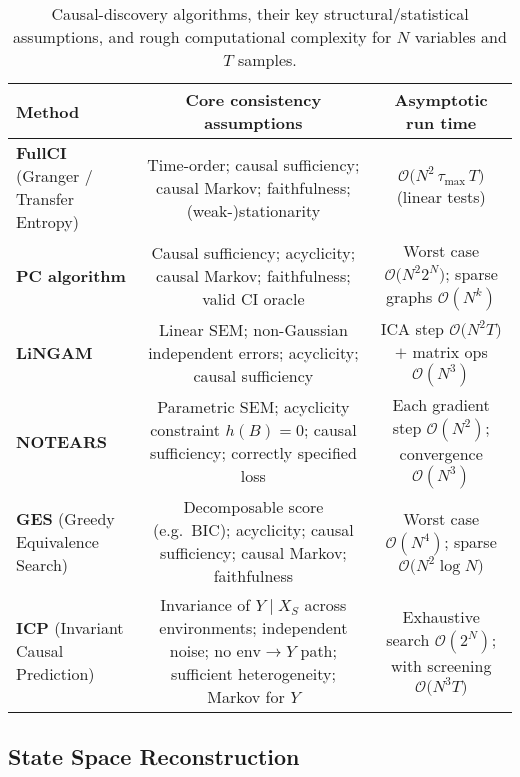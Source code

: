 \documentclass[14pt]{extarticle}
\begin{document}
	\begin{table}[htbp]
		\centering
		\begin{tabulary}{\textwidth}{L|C|C}
			\toprule
			\textbf{Method} & \textbf{Core consistency assumptions} & \textbf{Asymptotic run time}\\
			\midrule
			\textbf{FullCI} (Granger / Transfer Entropy) &
			Time-order; causal sufficiency; causal Markov; faithfulness; (weak-)stationarity &
			$\mathcal O\!\bigl(N^{2}\,\tau_{\max}\,T\bigr)$ (linear tests)\\[4pt] \hline
			
			\textbf{PC algorithm} &
			Causal sufficiency; acyclicity; causal Markov; faithfulness; valid CI oracle &
			Worst case $\mathcal O\!\bigl(N^{2}2^{N}\bigr)$; sparse graphs $\mathcal O(N^{k})$\\[4pt] \hline
			
			\textbf{LiNGAM} &
			Linear SEM; non-Gaussian independent errors; acyclicity; causal sufficiency &
			ICA step $\mathcal O\!\bigl(N^{2}T\bigr)$ $+$ matrix ops $\mathcal O(N^{3})$\\[4pt] \hline
			
			\textbf{NOTEARS} &
			Parametric SEM; acyclicity constraint $h(B)=0$; causal sufficiency; correctly specified loss &
			Each gradient step $\mathcal O(N^{2})$; convergence $\mathcal O(N^{3})$\\[4pt] \hline
			
			\textbf{GES} (Greedy Equivalence Search) &
			Decomposable score (e.g.\ BIC); acyclicity; causal sufficiency; causal Markov; faithfulness &
			Worst case $\mathcal O(N^{4})$; sparse $\mathcal O\!\bigl(N^{2}\log N\bigr)$\\[4pt] \hline
			
			\textbf{ICP} (Invariant Causal Prediction) &
			Invariance of $Y\mid X_S$ across environments; independent noise; no $\text{env}\!\to\!Y$ path; sufficient heterogeneity; Markov for $Y$ &
			Exhaustive search $\mathcal O(2^{N})$; with screening $\mathcal O\!\bigl(N^{3}T\bigr)$\\
			\bottomrule
		\end{tabulary}
		\caption{Causal-discovery algorithms, their key structural/statistical assumptions, and rough computational complexity for $N$ variables and $T$ samples.}
		\label{tab:causal_methods_assumptions}
	\end{table}
		
	\subsection{State Space Reconstruction}\label{sec:ssr}
	
\end{document}

